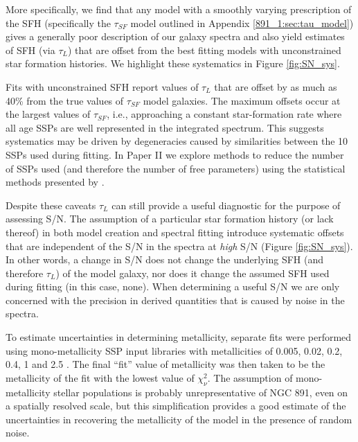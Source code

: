 More specifically, we find that any model with a smoothly varying
prescription of the SFH (specifically the $\tau_{SF}$ model outlined
in Appendix \ref{891_1:sec:tau_model}) gives a generally poor description of
our galaxy spectra and also yield estimates of SFH (via $\tau_L$) that
are offset from the best fitting models with unconstrained star
formation histories. We highlight these systematics in Figure
\ref{fig:SN_sys}.

Fits with unconstrained SFH report values of $\tau_L$ that are offset
by as much as 40\% from the true values of $\tau_{SF}$ model
galaxies. The maximum offsets occur at the largest values of
$\tau_{SF}$, i.e., approaching a constant star-formation rate where
all age SSPs are well represented in the integrated spectrum.  This
suggests systematics may be driven by degeneracies caused by
similarities between the 10 SSPs used during fitting.  In Paper II we
explore methods to reduce the number of SSPs used (and therefore the
number of free parameters) using the statistical methods presented by
\citet{Mosby15}.



Despite these caveats $\tau_L$ can still provide a useful diagnostic
for the purpose of assessing S/N. The assumption of a particular star
formation history (or lack thereof) in both model creation and
spectral fitting introduce systematic offsets that are independent of
the S/N in the spectra at {\it high} S/N (Figure \ref{fig:SN_sys}). In
other words, a change in S/N does not change the underlying SFH (and
therefore $\tau_L$) of the model galaxy, nor does it change the
assumed SFH used during fitting (in this case, none). When determining
a useful S/N we are only concerned with the precision in derived
quantities that is caused by noise in the spectra.

To estimate uncertainties in determining metallicity, separate fits
were performed using mono-metallicity SSP input libraries with
metallicities of 0.005, 0.02, 0.2, 0.4, 1 and 2.5 \Zsol.  The final
``fit'' value of metallicity was then taken to be the metallicity of
the fit with the lowest value of $\chi^2_\nu$. The assumption of
mono-metallicity stellar populations is probably unrepresentative of
NGC 891, even on a spatially resolved scale, but this simplification
provides a good estimate of the uncertainties in recovering the
metallicity of the model in the presence of random noise.

